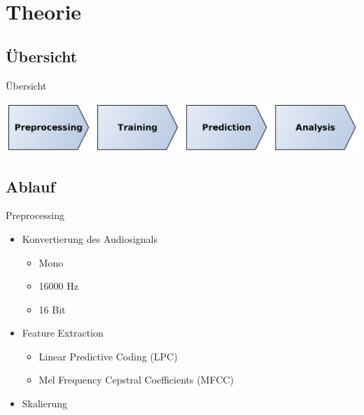 \section{Theorie}

\subsection{Übersicht}
\begin{frame}{Übersicht}
	\begin{center}
		\includegraphics[width=1.0\textwidth]{img/theorieuebersicht}
	\end{center}
\end{frame}

\subsection{Ablauf}
\begin{frame}{Preprocessing}
	\begin{itemize}[<+->]
		\item Konvertierung des Audiosignals
		\begin{itemize}[<1->]
			\item Mono
			\item 16000 Hz
			\item 16 Bit
		\end{itemize}
		\item Feature Extraction
		\begin{itemize}[<1->]
			\item Linear Predictive Coding (LPC)
			\item Mel Frequency Cepstral Coefficients (MFCC)
		\end{itemize}		
		\item Skalierung
	\end{itemize}
\end{frame}


